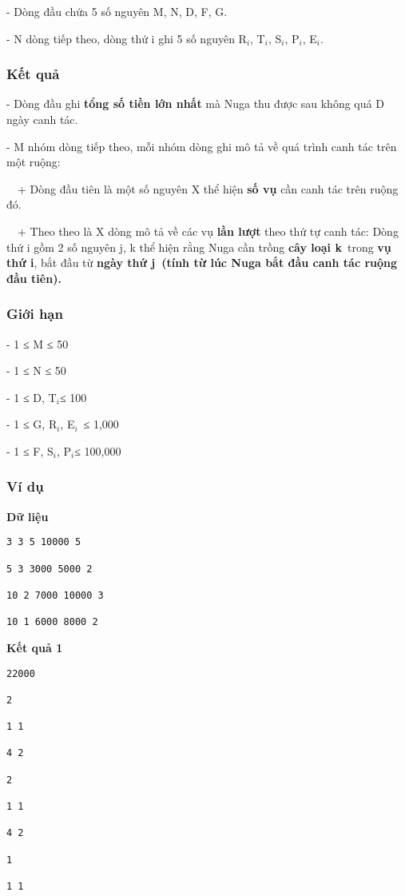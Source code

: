 - Dòng đầu chứa 5 số nguyên M, N, D, F, G.

- N dòng tiếp theo, dòng thứ i ghi 5 số nguyên R$_i$, T$_i$, S$_i$, P$_i$, E$_i$.

\subsubsection{Kết quả}

- Dòng đầu ghi \textbf{tổng số tiền lớn nhất} mà Nuga thu được sau không quá D ngày canh tác.

- M nhóm dòng tiếp theo, mỗi nhóm dòng ghi mô tả về quá trình canh tác trên một ruộng:

  + Dòng đầu tiên là một số nguyên X thể hiện \textbf{số vụ} cần canh tác trên ruộng đó.

  + Theo theo là X dòng mô tả về các vụ \textbf{lần lượt} theo thứ tự canh tác: Dòng thứ i gồm 2 số nguyên j, k thể hiện rằng Nuga cần trồng \textbf{cây loại k} trong \textbf{vụ thứ i}, bắt đầu từ \textbf{ngày thứ j (tính từ lúc Nuga bắt đầu canh tác ruộng đầu tiên).}

\subsubsection{Giới hạn}

- 1 ≤ M ≤ 50

- 1 ≤ N ≤ 50

- 1 ≤ D, T$_i $≤ 100

- 1 ≤ G, R$_i$, E$_i$ ≤ 1,000

- 1 ≤ F, S$_i$, P$_i $≤ 100,000

\subsubsection{Ví dụ}

\textbf{Dữ liệu}
\begin{verbatim}
3 3 5 10000 5

5 3 3000 5000 2

10 2 7000 10000 3

10 1 6000 8000 2

\end{verbatim}

\textbf{Kết quả 1}
\begin{verbatim}
22000

2

1 1

4 2

2

1 1

4 2

1

1 1

\end{verbatim}

